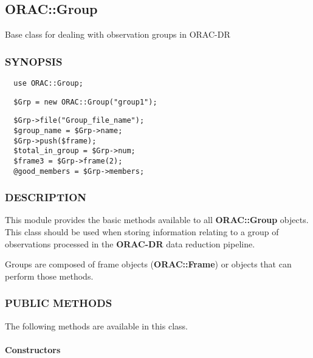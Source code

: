 \subsection{ORAC::Group\label{ORAC::Group}}

Base class for dealing with observation groups in ORAC-DR

\subsubsection*{SYNOPSIS\label{ORAC::Group_SYNOPSIS}}\begin{verbatim}
  use ORAC::Group;
\end{verbatim}
\begin{verbatim}
  $Grp = new ORAC::Group("group1");
\end{verbatim}
\begin{verbatim}
  $Grp->file("Group_file_name");
  $group_name = $Grp->name;
  $Grp->push($frame);
  $total_in_group = $Grp->num;
  $frame3 = $Grp->frame(2);
  @good_members = $Grp->members;
\end{verbatim}
\subsubsection*{DESCRIPTION\label{ORAC::Group_DESCRIPTION}}

This module provides the basic methods available to all
\textbf{ORAC::Group} objects. This class should be used when 
storing information relating to a group of observations
processed in the \textbf{ORAC-DR} data reduction pipeline.



Groups are composed of frame objects (\textbf{ORAC::Frame})
or objects that can perform those methods.

\subsubsection*{PUBLIC METHODS\label{ORAC::Group_PUBLIC_METHODS}}

The following methods are available in this class.

\paragraph*{Constructors\label{ORAC::Group_Constructors}}

